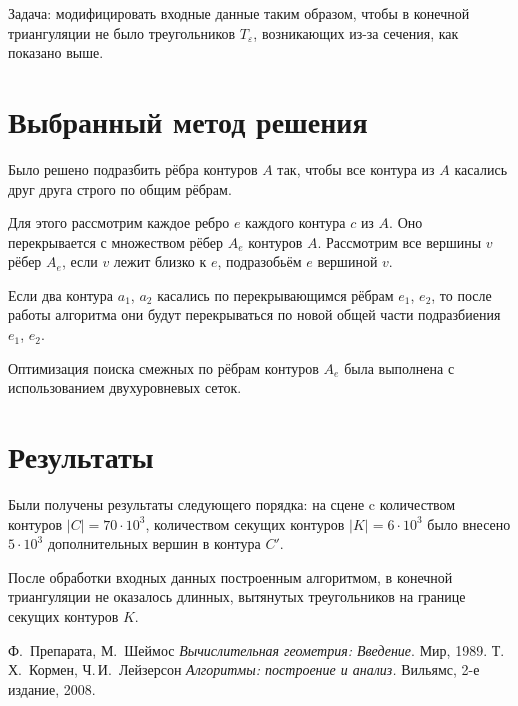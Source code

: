 \documentclass[a4paper,12pt,titlepage]{report}
\begin{document}
Задача: модифицировать входные данные таким образом,
чтобы в конечной триангуляции не было треугольников $T_\varepsilon$, 
возникающих из-за сечения, как показано выше.

%


\section*{Выбранный метод решения}
Было решено подразбить рёбра контуров $A$ так, 
чтобы все контура из $A$ касались друг друга строго по общим рёбрам.

Для этого рассмотрим каждое ребро $e$ каждого контура $c$ из $A$.
Оно перекрывается с множеством рёбер $A_e$ контуров $A$.
Рассмотрим все вершины $v$ рёбер $A_e$, если $v$ лежит близко к $e$, 
подразобьём $e$ вершиной $v$.

Если два контура $a_1$, $a_2$ касались по перекрывающимся рёбрам $e_1$, $e_2$, 
то после работы алгоритма они будут перекрываться по новой общей части подразбиения $e_1$, $e_2$.

Оптимизация поиска смежных по рёбрам контуров $A_e$ была выполнена с использованием 
двухуровневых сеток.

\section*{Результаты}
Были получены результаты следующего порядка: 
на сцене c количеством контуров $|C|=70 \cdot 10^3$,
количеством секущих контуров $|K|=6 \cdot 10^3$ 
было внесено $5 \cdot 10^3$ дополнительных вершин в контура $C'$. 

После обработки входных данных построенным алгоритмом, 
в конечной триангуляции не оказалось длинных, 
вытянутых треугольников на границе секущих контуров $K$.

\begin{thebibliography}{9}
  Ф.~Препарата, М.~Шеймос
  \emph{Вычислительная геометрия: Введение}.
  Мир,
  1989.
  Т.\,Х.~Кормен, Ч.\,И.~Лейзерсон
  \emph{Алгоритмы: построение и анализ.}
  Вильямс,
  2-е издание,
  2008.
\end{thebibliography}
\end{document}

